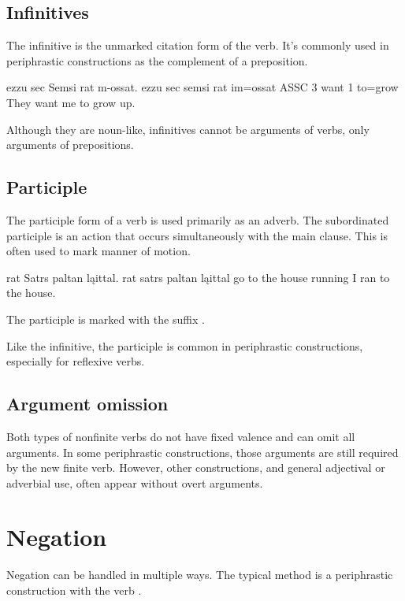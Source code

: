 \subsection{Infinitives}
The infinitive is the unmarked citation form of the verb. It's commonly used in periphrastic constructions as the complement of a preposition.

\begin{example}
	\script ezzu sec Semsi rat m-ossat.
	\bits ezzu sec semsi rat im=ossat
	\gloss ASSC 3 want 1 to=grow
	\tr They want me to grow up.
\end{example}

Although they are noun-like, infinitives cannot be arguments of verbs, only arguments of prepositions.

\subsection{Participle}
The participle form of a verb is used primarily as an adverb. The subordinated participle is an action that occurs simultaneously with the main clause. This is often used to mark manner of motion.

\begin{example}
	\script rat Satrs paltan ląittal.
	\bits rat satrs paltan ląittal
	 {go to} {the house} running
	\tr I ran to the house.
\end{example}

The participle is marked with the suffix .

Like the infinitive, the participle is common in periphrastic constructions, especially for reflexive verbs.

\subsection{Argument omission} \label{sub:nonfinite_argument_omission}
Both types of nonfinite verbs do not have fixed valence and can omit all arguments. In some periphrastic constructions, those arguments are still required by the new finite verb. However, other constructions, and general adjectival or adverbial use, often appear without overt arguments.

\section{Negation}
Negation can be handled in multiple ways. The typical method is a periphrastic construction with the verb .

